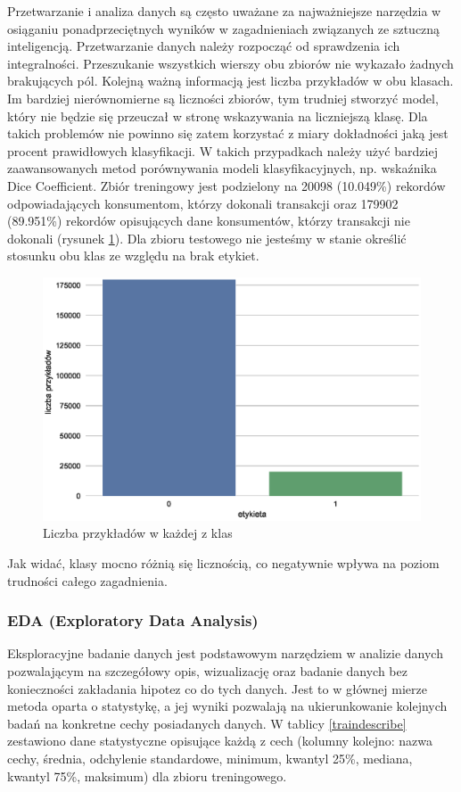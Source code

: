 \documentclass[12pt]{article}
\begin{document}
Przetwarzanie i analiza danych są często uważane za najważniejsze narzędzia w osiąganiu ponadprzeciętnych wyników w zagadnieniach związanych ze sztuczną inteligencją. Przetwarzanie danych należy rozpocząć od sprawdzenia ich integralności. Przeszukanie wszystkich wierszy obu zbiorów nie wykazało żadnych brakujących pól. Kolejną ważną informacją jest liczba przykładów w obu klasach. Im bardziej nierównomierne są liczności zbiorów, tym trudniej stworzyć model, który nie będzie się przeuczał w stronę wskazywania na liczniejszą klasę. Dla takich problemów nie powinno się zatem korzystać z miary dokładności jaką jest procent prawidłowych klasyfikacji. W takich przypadkach należy użyć bardziej zaawansowanych metod porównywania modeli klasyfikacyjnych, np. wskaźnika Dice Coefficient. Zbiór treningowy jest podzielony na 20098 (10.049\%) rekordów odpowiadających konsumentom, którzy dokonali transakcji oraz 179902 (89.951\%) rekordów opisujących dane konsumentów, którzy transakcji nie dokonali  (rysunek \ref{classescount}). Dla zbioru testowego nie jesteśmy w stanie określić stosunku obu klas ze względu na brak etykiet. 
\begin{figure}[H]
\centering \includegraphics[scale=0.7]{classes.eps}
\caption{Liczba przykładów w każdej z klas}
\label{classescount}
\end{figure}
Jak widać, klasy mocno różnią się licznością, co negatywnie wpływa na poziom trudności całego zagadnienia.

\subsubsection{EDA (Exploratory Data Analysis)}

Eksploracyjne badanie danych jest podstawowym narzędziem w analizie danych pozwalającym na szczegółowy opis, wizualizację oraz badanie danych bez konieczności zakładania hipotez co do tych danych. Jest to w głównej mierze metoda oparta o statystykę, a jej wyniki pozwalają na ukierunkowanie kolejnych badań na konkretne cechy posiadanych danych. 
\newline W tablicy \ref{traindescribe} zestawiono dane statystyczne opisujące każdą z cech (kolumny kolejno: nazwa cechy, średnia, odchylenie standardowe, minimum, kwantyl 25\%, mediana, kwantyl 75\%, maksimum) dla zbioru treningowego.
\end{document}

